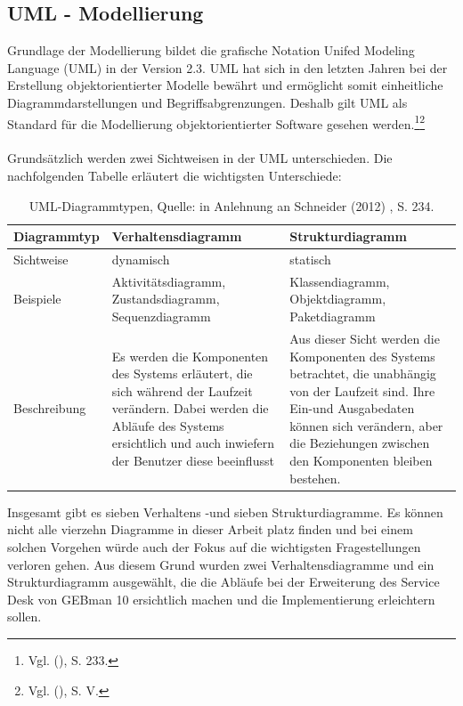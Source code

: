 \newpage


\subsection{UML - Modellierung}
\noindent
Grundlage der Modellierung bildet die grafische Notation Unifed Modeling Language (UML) in der Version 2.3. UML hat sich in den letzten Jahren bei der Erstellung objektorientierter Modelle bewährt und ermöglicht somit einheitliche Diagrammdarstellungen und Begriffsabgrenzungen. Deshalb gilt UML als Standard für die Modellierung objektorientierter Software gesehen werden.\footnote{Vgl. \citeauthor{Schneider} (\citeyear{Schneider}), S. 233.}\footnote{Vgl. \citeauthor{Balzert} (\citeyear{Balzert}), S. V.}\\\\
Grundsätzlich werden zwei Sichtweisen in der UML unterschieden. Die nachfolgenden Tabelle erläutert die wichtigsten Unterschiede:

\begin{table}[h!]
    \begin{tabular}{ | p{2.5cm}| p{6cm} | p{6cm} |}
    \hline
    Diagrammtyp & Verhaltensdiagramm & Strukturdiagramm \\ \hline
   Sichtweise & dynamisch & statisch \\ \hline
   Beispiele & Aktivitätsdiagramm, Zustandsdiagramm, Sequenzdiagramm &  Klassendiagramm, 
   Objektdiagramm, Paketdiagramm\\ \hline
   Beschreibung &  Es werden die Komponenten des Systems erläutert, die sich während der Laufzeit 
   verändern. Dabei werden die Abläufe des Systems ersichtlich und auch inwiefern der Benutzer diese 
   beeinflusst & Aus dieser Sicht werden die Komponenten des Systems betrachtet, die unabhängig von 
   der Laufzeit sind. Ihre Ein-und Ausgabedaten können sich verändern, aber die Beziehungen zwischen 
   den Komponenten bleiben bestehen. \\ \hline  
    \end{tabular}
    \caption[UML-Diagrammtypen]{UML-Diagrammtypen, Quelle: in Anlehnung an Schneider (2012) , S. 234.}
\end{table}


\noindent
Insgesamt gibt es sieben Verhaltens -und sieben Strukturdiagramme. Es können nicht alle vierzehn Diagramme in dieser Arbeit platz finden und bei einem solchen Vorgehen würde auch der Fokus auf die wichtigsten Fragestellungen verloren gehen. Aus diesem Grund wurden zwei Verhaltensdiagramme und ein Strukturdiagramm ausgewählt, die die Abläufe bei der Erweiterung des Service Desk von GEBman 10 ersichtlich machen und die Implementierung erleichtern sollen. \\

